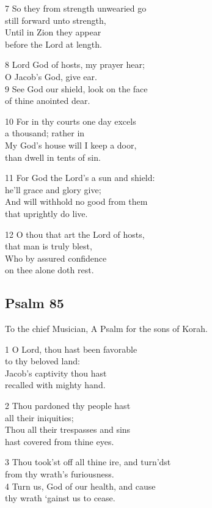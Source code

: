 7 So they from strength unwearied go\\
still forward unto strength,\\
Until in Zion they appear\\
before the Lord at length.

8 Lord God of hosts, my prayer hear;\\
O Jacob’s God, give ear.\\
9 See God our shield, look on the face\\
of thine anointed dear.

10 For in thy courts one day excels\\
a thousand; rather in\\
My God’s house will I keep a door,\\
than dwell in tents of sin.

11 For God the Lord’s a sun and shield:\\
he’ll grace and glory give;\\
And will withhold no good from them\\
that uprightly do live.

12 O thou that art the Lord of hosts,\\
that man is truly blest,\\
Who by assured confidence\\
on thee alone doth rest.

\begin{center}
\quad{}\quad{}
\end{center}

\subsection*{Psalm 85}

To the chief Musician,
A Psalm for the sons of Korah.

1 O Lord, thou hast been favorable\\
to thy beloved land:\\
Jacob’s captivity thou hast\\
recalled with mighty hand.

2 Thou pardoned thy people hast\\
all their iniquities;\\
Thou all their trespasses and sins\\
hast covered from thine eyes.

3 Thou took’st off all thine ire, and turn’dst\\
from thy wrath’s furiousness.\\
4 Turn us, God of our health, and cause\\
thy wrath ‘gainst us to cease.

